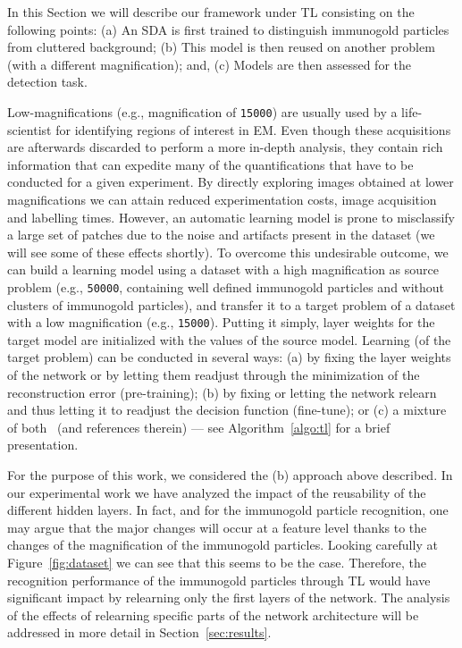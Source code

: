 \documentclass[a4paper,11pt]{article}
\newcommand{\1}{\mathbbm{1}}
\newcommand{\fref}[1]{Figure~\ref{#1}}
\newcommand{\sref}[1]{Section~\ref{#1}}
\newcommand{\algoref}[1]{Algorithm~\ref{#1}}
\newcommand{\db}[1]{\texttt{#1}}
\theoremstyle{plain}
\begin{document}
In this Section we will describe our framework under \ac{TL} consisting on the following points: (a) An \ac{SDA} is first trained to distinguish immunogold particles from cluttered background; (b) This model is then reused on another problem (with a different magnification); and, (c) Models are then assessed for the detection task.

Low-magnifications (e.g., magnification of \db{15000}) are usually used by a life-scientist for identifying regions of interest in \ac{EM}. Even though these acquisitions are afterwards discarded to perform a more in-depth analysis, they contain rich information that can expedite many of the quantifications that have to be conducted for a given experiment.
By directly exploring images obtained at lower magnifications we can attain reduced experimentation costs, image acquisition and labelling times.
However, an automatic learning model is prone to misclassify a large set of patches due to the noise and artifacts present in the dataset (we will see some of these effects shortly). To overcome this undesirable outcome, we can build a learning model using a dataset with a high magnification as source problem (e.g., \db{50000}, containing well defined immunogold particles and without clusters of immunogold particles), and transfer it to a target problem of a dataset with a low magnification (e.g., \db{15000}).
Putting it simply, layer weights for the target model are initialized with the values of the source model. Learning (of the target problem) can be conducted in several ways: (a) by fixing the layer weights of the network or by letting them readjust through the minimization of the reconstruction error (pre-training); (b) by fixing or letting the network relearn and thus letting it to readjust the decision function (fine-tune); or (c) a mixture of both~\cite{Chetak2014,Chetak2014b,Telmo2014,bengio2012deep,theano2012} (and references therein) --- see \algoref{algo:tl} for a brief presentation.

For the purpose of this work, we considered the (b) approach above described. In our experimental work we have analyzed the impact of the reusability of the different hidden layers. In fact, and for the immunogold particle recognition, one may argue that the major changes will occur at a feature level thanks to the changes of the magnification of the immunogold particles. Looking carefully at \fref{fig:dataset} we can see that this seems to be the case. Therefore, the recognition performance of the immunogold particles through \ac{TL} would have significant impact by relearning only the first layers of the network. The analysis of the effects of relearning specific parts of the network architecture will be addressed in more detail in \sref{sec:results}.
\end{document}
